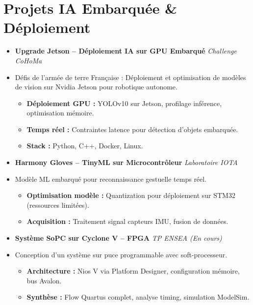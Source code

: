 \documentclass[a4paper,11pt]{article}
\begin{document}
\section{Projets IA Embarquée \& Déploiement}
\begin{itemize}[leftmargin=*, label={}]

\item \textbf{Upgrade Jetson -- Déploiement IA sur GPU Embarqué} \hfill \textit{Challenge CoHoMa}
\vspace{-2pt}
\item \small{Défis de l'armée de terre Française : Déploiement et optimisation de modèles de vision sur Nvidia Jetson pour robotique autonome.}
    \begin{itemize}[leftmargin=0.4cm, nosep, label=\tiny$\bullet$]
        \item \small{\textbf{Déploiement GPU :} YOLOv10 sur Jetson, profilage inférence, optimisation mémoire.}
        \item \small{\textbf{Temps réel :} Contraintes latence pour détection d'objets embarquée.}
        \item \small{\textbf{Stack :} Python, C++, Docker, Linux.}
    \end{itemize}
    \vspace{3pt}

\item \textbf{Harmony Gloves -- TinyML sur Microcontrôleur} \hfill \textit{Laboratoire IOTA}
\vspace{-2pt}
\item \small{Modèle ML embarqué pour reconnaissance gestuelle temps réel.}
    \begin{itemize}[leftmargin=0.4cm, nosep, label=\tiny$\bullet$]
        \item \small{\textbf{Optimisation modèle :} Quantization pour déploiement sur STM32 (ressources limitées).}
        \item \small{\textbf{Acquisition :} Traitement signal capteurs IMU, fusion de données.}
    \end{itemize}
    \vspace{3pt}

\item \textbf{Système SoPC sur Cyclone V -- FPGA} \hfill \textit{TP ENSEA (En cours)}
\vspace{-2pt}
\item \small{Conception d'un système sur puce programmable avec soft-processeur.}
    \begin{itemize}[leftmargin=0.4cm, nosep, label=\tiny$\bullet$]
        \item \small{\textbf{Architecture :} Nios V via Platform Designer, configuration mémoire, bus Avalon.}
        \item \small{\textbf{Synthèse :} Flow Quartus complet, analyse timing, simulation ModelSim.}
    \end{itemize}
    \vspace{3pt}


\end{itemize}
\end{document}
